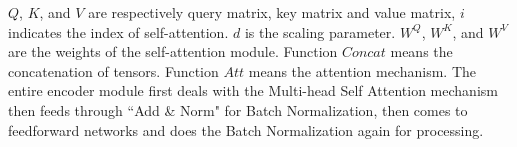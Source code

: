 \documentclass[11pt,a4paper]{article}
\begin{document}
$Q$, $K$, and $V$ are respectively query matrix, key matrix and value matrix, $i$ indicates the index of self-attention. $d$ is the scaling parameter. $W^Q$, $W^K$, and $W^V$ are the weights of the self-attention module. Function $Concat$ means the concatenation of tensors. Function $Att$ means the attention mechanism. The entire encoder module first deals with the Multi-head Self Attention mechanism then feeds through ``Add \& Norm" for Batch Normalization, then comes to feedforward networks and does the Batch Normalization again for processing.
\makeatletter\def\@captype{table}\makeatother
\begin{table}[!htbp] 
\centering
\begin{tabular}{lllllllllll|llllllllllll|llllllllllll|llllllllllll}


\end{tabular}
\end{table}
\end{document}
